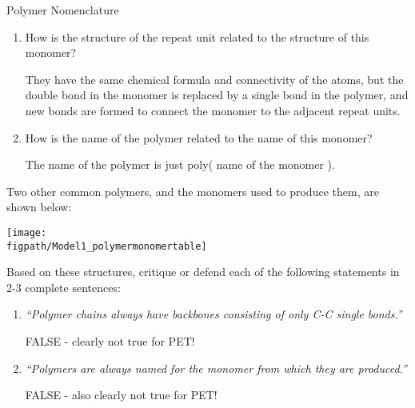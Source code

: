 \begin{activity}{Polymer Nomenclature}
\begin{ctqs}
\begin{enumerate}
\begin{solution}[0.5in]
				\end{solution}
				
			\item How is the structure of the repeat unit related to the structure of this monomer?
			
				\begin{solution}[0.5in]
				
					They have the same chemical formula and connectivity of the atoms, but the double bond in the monomer is replaced by a single bond in the polymer, and new bonds are formed to connect the monomer to the adjacent repeat units.
					
				\end{solution}
				
			\item How is the name of the polymer related to the name of this monomer?
			
				\begin{solution}[0.5in]
				
					The name of the polymer is just poly( name of the monomer ).
					
				\end{solution}
				
		\end{enumerate}
		
	\question Two other common polymers, and the monomers used to produce them, are shown below:
	
		\centerline{\texttt{[image: \\figpath/Model1\_polymermonomertable]}}
		
		Based on these structures, critique or defend each of the following statements in 2-3 complete sentences:
		
		\begin{enumerate}
			\item \emph{``Polymer chains always have backbones consisting of only C-C single bonds.''}
			
				\begin{solution}[1.5in]
					FALSE - clearly not true for PET!
				\end{solution}
			
			\item \emph{``Polymers are always named for the monomer from which they are produced.''}
			
				\begin{solution}[1.5in]
					FALSE - also clearly not true for PET!
				\end{solution}
			

\end{enumerate}
\end{ctqs}
\end{activity}
